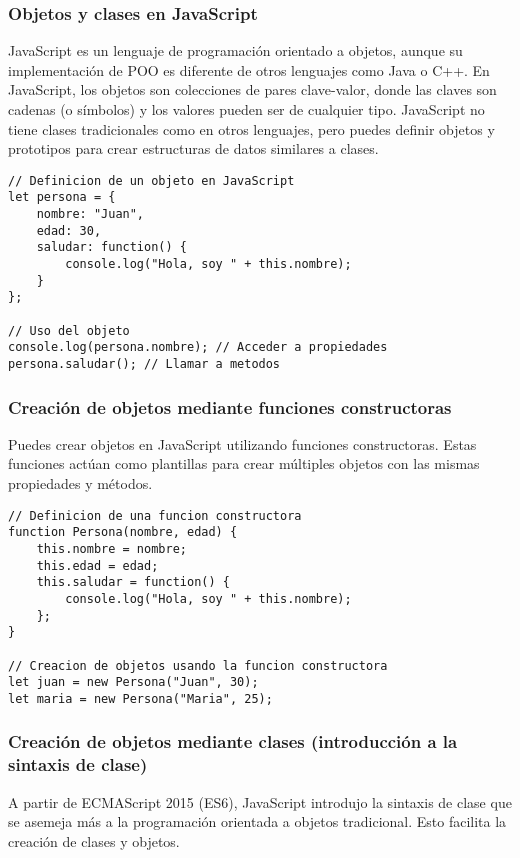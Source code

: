 \documentclass[executivepaper]{article}
\begin{document}
\subsubsection*{Objetos y clases en JavaScript}
JavaScript es un lenguaje de programación orientado a objetos, aunque su implementación de POO es diferente de otros lenguajes como Java o C++. En JavaScript, los objetos son colecciones de pares clave-valor, donde las claves son cadenas (o símbolos) y los valores pueden ser de cualquier tipo. JavaScript no tiene clases tradicionales como en otros lenguajes, pero puedes definir objetos y prototipos para crear estructuras de datos similares a clases.

\begin{lstlisting}
// Definicion de un objeto en JavaScript
let persona = {
    nombre: "Juan",
    edad: 30,
    saludar: function() {
        console.log("Hola, soy " + this.nombre);
    }
};

// Uso del objeto
console.log(persona.nombre); // Acceder a propiedades
persona.saludar(); // Llamar a metodos
\end{lstlisting}

\subsubsection*{Creación de objetos mediante funciones constructoras}
Puedes crear objetos en JavaScript utilizando funciones constructoras. Estas funciones actúan como plantillas para crear múltiples objetos con las mismas propiedades y métodos.

\begin{lstlisting}
// Definicion de una funcion constructora
function Persona(nombre, edad) {
    this.nombre = nombre;
    this.edad = edad;
    this.saludar = function() {
        console.log("Hola, soy " + this.nombre);
    };
}

// Creacion de objetos usando la funcion constructora
let juan = new Persona("Juan", 30);
let maria = new Persona("Maria", 25);

\end{lstlisting}

\subsubsection*{Creación de objetos mediante clases (introducción a la sintaxis de clase)}
A partir de ECMAScript 2015 (ES6), JavaScript introdujo la sintaxis de clase que se asemeja más a la programación orientada a objetos tradicional. Esto facilita la creación de clases y objetos.
\end{document}
